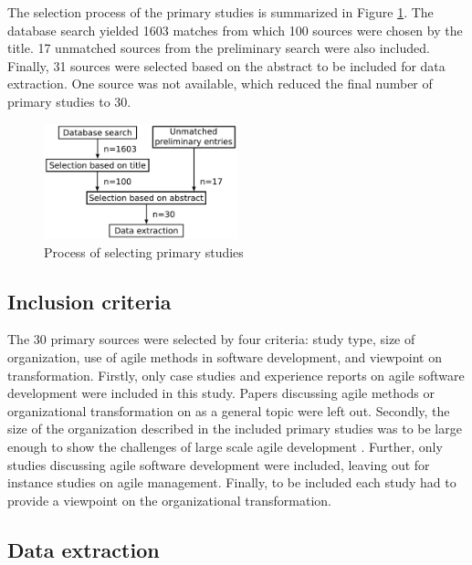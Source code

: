 \documentclass[lnbip]{svmultln}
\begin{document}
The selection process of the primary studies is summarized in Figure
\ref{fig:selection_process}. The database search yielded 1603 matches from which
100 sources were chosen by the title. 17 unmatched sources from the preliminary
search were also included. Finally, 31 sources were selected based on the
abstract to be included for data extraction. One source was not available, which
reduced the final number of primary studies to 30.

\begin{figure}[htb]
  \begin{center}
    \includegraphics[width=0.5\textwidth]{researchprocess}
    \caption{Process of selecting primary studies}
    \label{fig:selection_process}
  \end{center}
\end{figure}

\subsection{Inclusion criteria}

The 30 primary sources were selected by four criteria: study type, size of
organization, use of agile methods in software development, and viewpoint on
transformation. Firstly, only case studies and experience reports on agile
software development were included in this study. Papers discussing agile
methods or organizational transformation on as a general topic were left out.
Secondly, the size of the organization described in the included primary studies
was to be large enough to show the challenges of large scale agile development
. Further, only studies discussing agile software development
were included, leaving out for instance studies on agile management. Finally, to
be included each study had to provide a viewpoint on the organizational
transformation.

\subsection{Data extraction}
\end{document}
